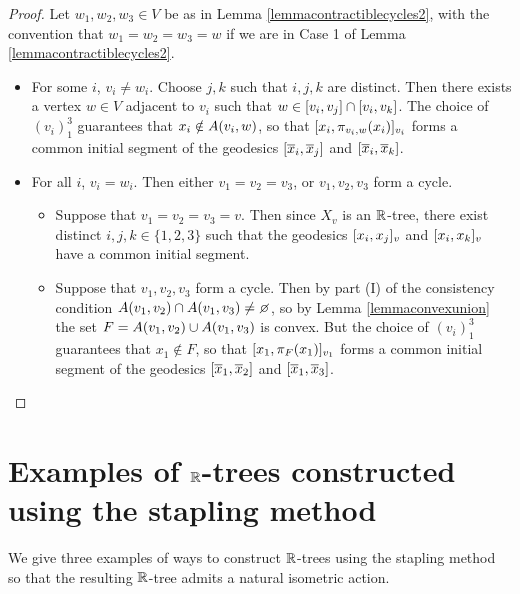 \begin{proof}
Let $w_1,w_2,w_3\in V$ be as in Lemma \ref{lemmacontractiblecycles2}, with the convention that $w_1 = w_2 = w_3 = w$ if we are in Case 1 of Lemma \ref{lemmacontractiblecycles2}.
\begin{itemize}
\item[Case A:] For some $i$, $v_i\neq w_i$. Choose $j,k$ such that $i,j,k$ are distinct. Then there exists a vertex $w\in V$ adjacent to $v_i$ such that $w\in[v_i,v_j]\cap [v_i,v_k]$. The choice of $(v_i)_1^3$ guarantees that $x_i\notin A(v_i,w)$, so that $[x_i,\pi_{v_i,w}(x_i)]_{v_i}$ forms a common initial segment of the geodesics $[\overline x_i,\overline x_j]$ and $[\overline x_i,\overline x_k]$.
\item[Case B:] For all $i$, $v_i = w_i$. Then either $v_1 = v_2 = v_3$, or $v_1,v_2,v_3$ form a cycle.
\begin{itemize}
\item[Case B1:] Suppose that $v_1 = v_2 = v_3 = v$. Then since $X_v$ is an $\R$-tree, there exist distinct $i,j,k\in\{1,2,3\}$ such that the geodesics $[x_i,x_j]_v$ and $[x_i,x_k]_v$ have a common initial segment.
\item[Case B2:] Suppose that $v_1,v_2,v_3$ form a cycle. Then by part (I) of the consistency condition $\set{v_1}{v_2}\cap\set{v_1}{v_3}\neq\emptyset$, so by Lemma \ref{lemmaconvexunion} the set $F = A(v_1,v_2)\cup A(v_1,v_3)$ is convex. But the choice of $(v_i)_1^3$ guarantees that $x_1\notin F$, so that $[x_1,\pi_F(x_1)]_{v_1}$ forms a common initial segment of the geodesics $[\overline x_1,\overline x_2]$ and $[\overline x_1,\overline x_3]$.
\end{itemize}
\end{itemize}
\end{proof}

\section{Examples of $\R$-trees constructed using the stapling method}
\label{subsectionstaplingexamples}
We give three examples of ways to construct $\R$-trees using the stapling method so that the resulting $\R$-tree admits a natural isometric action.

